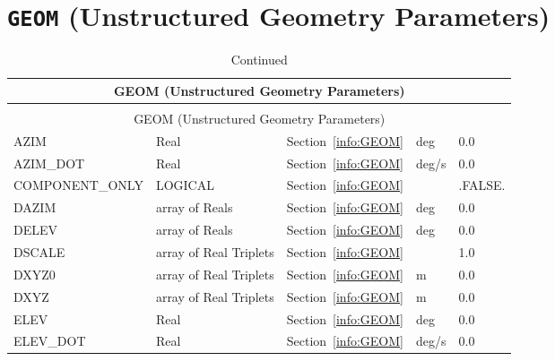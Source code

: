 \documentclass[12pt]{article}
\begin{document}
\section{\texorpdfstring{{\tt GEOM}}{GEOM} (Unstructured Geometry Parameters)}

\begin{longtable}{@{\extracolsep{\fill}}|l|l|l|l|l|}
\caption[Unstructured geometry parameters ({\ct GEOM} namelist group)]{For more information see Section~\ref{info:GEOM}.}
\label{tbl:GEOM} \\
\hline
\multicolumn{5}{|c|}{{\ct GEOM} (Unstructured Geometry Parameters)} \\
\hline \hline
\endfirsthead
\caption[]{Continued} \\
\hline
\multicolumn{5}{|c|}{{\ct GEOM} (Unstructured Geometry Parameters)} \\
\hline \hline
\endhead
{\ct AZIM}         & Real                   & Section~\ref{info:GEOM}            &  deg      &    0.0                   \\ \hline
{\ct AZIM\_DOT}    & Real                   & Section~\ref{info:GEOM}            &  deg/s    &    0.0                   \\ \hline
{\ct COMPONENT\_ONLY} & LOGICAL             & Section~\ref{info:GEOM}            &           &  {\ct .FALSE.}           \\ \hline
{\ct DAZIM}        & array of Reals         & Section~\ref{info:GEOM}            &  deg      &    0.0                   \\ \hline
{\ct DELEV}        & array of Reals         & Section~\ref{info:GEOM}            &  deg      &    0.0                   \\ \hline
{\ct DSCALE}       & array of Real Triplets & Section~\ref{info:GEOM}            &           &   1.0                    \\ \hline
{\ct DXYZ0}        & array of Real Triplets & Section~\ref{info:GEOM}            &   m       &   0.0                    \\ \hline
{\ct DXYZ}         & array of Real Triplets & Section~\ref{info:GEOM}            &   m       &   0.0                    \\ \hline
{\ct ELEV}         & Real                   & Section~\ref{info:GEOM}            &  deg      &    0.0                   \\ \hline
{\ct ELEV\_DOT}    & Real                   & Section~\ref{info:GEOM}            &  deg/s    &    0.0                   \\ \hline

\end{longtable}
\end{document}
